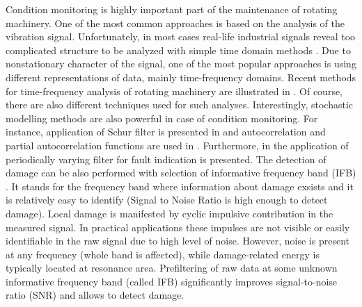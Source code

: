 \documentclass[journal]{IEEEtran}
\begin{document}
Condition monitoring is highly important part of the maintenance of rotating machinery. One of the most common approaches is based on the analysis of the vibration signal. Unfortunately, in most cases real-life industrial signals reveal too complicated structure to be analyzed with simple time domain methods \cite{randall2011rolling}. Due to nonstationary character of the signal, one of the most popular approaches is using different representations of data, mainly time-frequency domains. Recent methods for time-frequency analysis of rotating machinery are illustrated in \cite{feng2013recent}. Of course, there are also different techniques used for such analyses. Interestingly, stochastic modelling methods are also powerful in case of condition monitoring. For instance, application of Schur filter is presented in \cite{Makowski2014130} and autocorrelation and partial autocorrelation functions are used in \cite{zak2014novel}. Furthermore, in \cite{kruczek2017cyclic} the application of periodically varying filter for fault indication is presented.
The detection of damage can be also performed with selection of informative frequency band (IFB) \cite{obuchowski2014selection,antoni2006spectral,combet2009optimal}.
It stands for the frequency band where information about damage exsists and it is relatively easy to identify (Signal to Noise Ratio is high enough to detect damage). Local damage is manifested by cyclic impulsive contribution in the measured signal. In practical applications these impulses are not visible or easily identifiable in the raw signal due to high level of noise. However, noise is present at any frequency (whole band is affected), while damage-related energy is typically located at resonance area. Prefiltering of raw data at some unknown informative frequency band (called IFB) significantly improves signal-to-noise ratio (SNR) and allows to detect damage.
\end{document}

